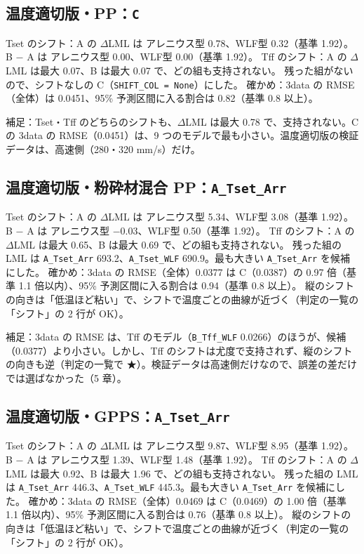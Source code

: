 \documentclass[paper=a4paper,fontsize=10.5pt,line_length=44zw,number_of_lines=40]{jlreq}
\begin{document}
\subsection{温度適切版・PP：\texttt{C}}
Tset のシフト：A の $\Delta$LML は アレニウス型 0.78、WLF型 0.32（基準 1.92）。B − A は アレニウス型 0.00、WLF型 0.00（基準 1.92）。 Tff のシフト：A の $\Delta$LML は最大 0.07、B は最大 0.07 で、どの組も支持されない。 残った組がないので、シフトなしの C（\texttt{SHIFT\_\allowbreak{}COL = None}）にした。 確かめ：3data の RMSE（全体）は 0.0451、95\% 予測区間に入る割合は 0.82（基準 0.8 以上）。


補足：Tset・Tff のどちらのシフトも、$\Delta$LML は最大 0.78 で、支持されない。C の 3data の RMSE（0.0451）は、9 つのモデルで最も小さい。温度適切版の検証データは、高速側（280・320 mm/s）だけ。
\subsection{温度適切版・粉砕材混合 PP：\texttt{A\_\allowbreak{}Tset\_\allowbreak{}Arr}}
Tset のシフト：A の $\Delta$LML は アレニウス型 5.34、WLF型 3.08（基準 1.92）。B − A は アレニウス型 $-0.03$、WLF型 0.50（基準 1.92）。 Tff のシフト：A の $\Delta$LML は最大 0.65、B は最大 0.69 で、どの組も支持されない。 残った組の LML は \texttt{A\_\allowbreak{}Tset\_\allowbreak{}Arr} 693.2、\texttt{A\_\allowbreak{}Tset\_\allowbreak{}WLF} 690.9。最も大きい \texttt{A\_\allowbreak{}Tset\_\allowbreak{}Arr} を候補にした。 確かめ：3data の RMSE（全体）0.0377 は C（0.0387）の 0.97 倍（基準 1.1 倍以内）、95\% 予測区間に入る割合は 0.94（基準 0.8 以上）。 縦のシフトの向きは「低温ほど粘い」で、シフトで温度ごとの曲線が近づく（判定の一覧の「シフト」の 2 行が OK）。


補足：3data の RMSE は、Tff のモデル（\texttt{B\_\allowbreak{}Tff\_\allowbreak{}WLF} 0.0266）のほうが、候補（0.0377）より小さい。しかし、Tff のシフトは尤度で支持されず、縦のシフトの向きも逆（判定の一覧で ★）。検証データは高速側だけなので、誤差の差だけでは選ばなかった（5 章）。
\subsection{温度適切版・GPPS：\texttt{A\_\allowbreak{}Tset\_\allowbreak{}Arr}}
Tset のシフト：A の $\Delta$LML は アレニウス型 9.87、WLF型 8.95（基準 1.92）。B − A は アレニウス型 1.39、WLF型 1.48（基準 1.92）。 Tff のシフト：A の $\Delta$LML は最大 0.92、B は最大 1.96 で、どの組も支持されない。 残った組の LML は \texttt{A\_\allowbreak{}Tset\_\allowbreak{}Arr} 446.3、\texttt{A\_\allowbreak{}Tset\_\allowbreak{}WLF} 445.3。最も大きい \texttt{A\_\allowbreak{}Tset\_\allowbreak{}Arr} を候補にした。 確かめ：3data の RMSE（全体）0.0469 は C（0.0469）の 1.00 倍（基準 1.1 倍以内）、95\% 予測区間に入る割合は 0.76（基準 0.8 以上）。 縦のシフトの向きは「低温ほど粘い」で、シフトで温度ごとの曲線が近づく（判定の一覧の「シフト」の 2 行が OK）。
\end{document}
